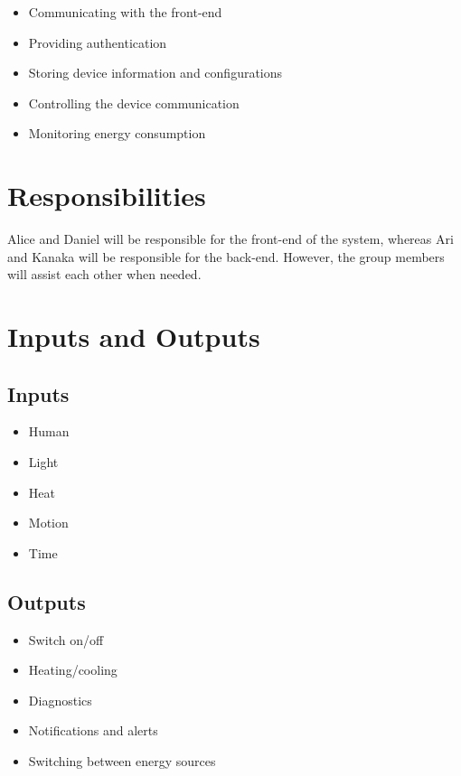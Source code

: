 \documentclass[paper=a4, onecolumn, fontsize=11pt]{scrartcl} %
\begin{document}
	\begin{itemize}
		\item Communicating with the front-end
		\item Providing authentication 
		\item Storing device information and configurations
		\item Controlling the device communication 
		\item Monitoring energy consumption
	\end{itemize}
	
	\section{Responsibilities}
	Alice and Daniel will be responsible for the front-end of the system, whereas Ari and Kanaka will be responsible for the back-end. However, the group members will assist each other when needed. 
	
	\section{Inputs and Outputs}
	\subsection{Inputs}
	\begin{itemize}
	\item Human
	\item Light
	\item Heat
	\item Motion
	\item Time
	\end{itemize}
	
	\subsection{Outputs}
	\begin{itemize}
	\item Switch on/off
	\item Heating/cooling
	\item Diagnostics
	\item Notifications and alerts
	\item Switching between energy sources
	\end{itemize}
	
\end{document}
